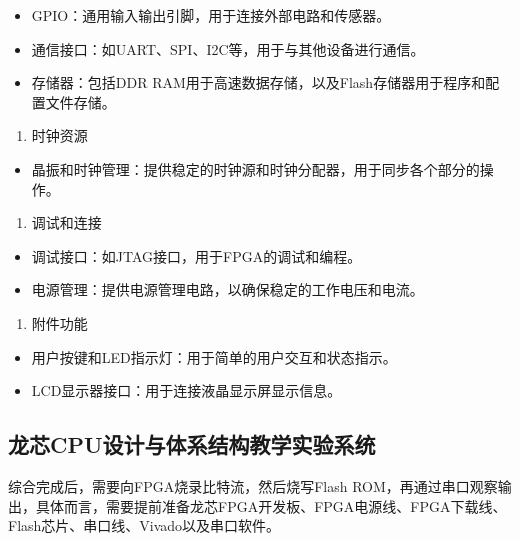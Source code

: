 \begin{itemize}
\item
  GPIO：通用输入输出引脚，用于连接外部电路和传感器。
\item
  通信接口：如UART、SPI、I2C等，用于与其他设备进行通信。
\item
  存储器：包括DDR RAM用于高速数据存储，以及Flash存储器用于程序和配置文件存储。
\end{itemize}

\begin{enumerate}
\def\labelenumi{\arabic{enumi}.}
\setcounter{enumi}{1}
\tightlist
\item
  时钟资源
\end{enumerate}

\begin{itemize}
\tightlist
\item
  晶振和时钟管理：提供稳定的时钟源和时钟分配器，用于同步各个部分的操作。
\end{itemize}

\begin{enumerate}
\def\labelenumi{\arabic{enumi}.}
\setcounter{enumi}{2}
\tightlist
\item
  调试和连接
\end{enumerate}

\begin{itemize}
\item
  调试接口：如JTAG接口，用于FPGA的调试和编程。
\item
  电源管理：提供电源管理电路，以确保稳定的工作电压和电流。
\end{itemize}

\begin{enumerate}
\def\labelenumi{\arabic{enumi}.}
\setcounter{enumi}{3}
\tightlist
\item
  附件功能
\end{enumerate}

\begin{itemize}
\item
  用户按键和LED指示灯：用于简单的用户交互和状态指示。
\item
  LCD显示器接口：用于连接液晶显示屏显示信息。
\end{itemize}

\subsection{龙芯CPU设计与体系结构教学实验系统}\label{sec:02-design-environment-005}

综合完成后，需要向FPGA烧录比特流，然后烧写Flash ROM，再通过串口观察输出，具体而言，需要提前准备龙芯FPGA开发板、FPGA电源线、FPGA下载线、Flash芯片、串口线、Vivado以及串口软件。

